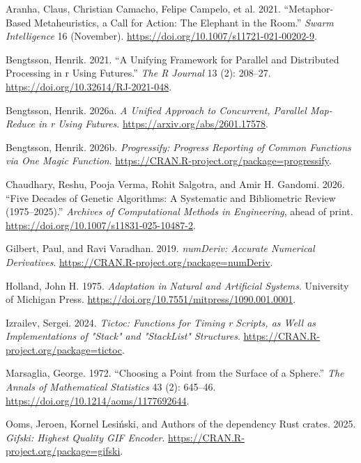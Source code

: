 \documentclass[
  a4paper,
]{article}
\newlength{\cslhangindent}
\newenvironment{CSLReferences}[2] %
 {\begin{list}{}{%
  \setlength{\itemindent}{0pt}
  \setlength{\leftmargin}{0pt}
  \setlength{\parsep}{0pt}
  \ifodd #1
   \setlength{\leftmargin}{\cslhangindent}
   \setlength{\itemindent}{-1\cslhangindent}
  \fi
  \setlength{\itemsep}{#2\baselineskip}}}
 {\end{list}}
\newcommand{\+}{\phantom{-}}
\begin{document}
\protect{}\label{refs}
\begin{CSLReferences}{1}{1}
Aranha, Claus, Christian Camacho, Felipe Campelo, et al. 2021.
{``Metaphor-Based Metaheuristics, a Call for Action: The Elephant in the
Room.''} \emph{Swarm Intelligence} 16 (November).
\url{https://doi.org/10.1007/s11721-021-00202-9}.

Bengtsson, Henrik. 2021. {``A Unifying Framework for Parallel and
Distributed Processing in r Using Futures.''} \emph{The R Journal} 13
(2): 208--27. \url{https://doi.org/10.32614/RJ-2021-048}.

Bengtsson, Henrik. 2026a. \emph{A Unified Approach to Concurrent,
Parallel Map-Reduce in r Using Futures}.
\url{https://arxiv.org/abs/2601.17578}.

Bengtsson, Henrik. 2026b. \emph{Progressify: Progress Reporting of
Common Functions via One Magic Function}.
\url{https://CRAN.R-project.org/package=progressify}.

Chaudhary, Reshu, Pooja Verma, Rohit Salgotra, and Amir H. Gandomi.
2026. {``Five Decades of Genetic Algorithms: A Systematic and
Bibliometric Review (1975--2025).''} \emph{Archives of Computational
Methods in Engineering}, ahead of print.
\url{https://doi.org/10.1007/s11831-025-10487-2}.

Gilbert, Paul, and Ravi Varadhan. 2019. \emph{numDeriv: Accurate
Numerical Derivatives}.
\url{https://CRAN.R-project.org/package=numDeriv}.

Holland, John H. 1975. \emph{{Adaptation in Natural and Artificial
Systems}}. University of Michigan Press.
\url{https://doi.org/10.7551/mitpress/1090.001.0001}.

Izrailev, Sergei. 2024. \emph{Tictoc: Functions for Timing r Scripts, as
Well as Implementations of "Stack" and "StackList" Structures}.
\url{https://CRAN.R-project.org/package=tictoc}.

Marsaglia, George. 1972. {``Choosing a Point from the Surface of a
Sphere.''} \emph{The Annals of Mathematical Statistics} 43 (2): 645--46.
\url{https://doi.org/10.1214/aoms/1177692644}.

Ooms, Jeroen, Kornel Lesiński, and Authors of the dependency Rust
crates. 2025. \emph{Gifski: Highest Quality GIF Encoder}.
\url{https://CRAN.R-project.org/package=gifski}.


\end{CSLReferences}
\end{document}
